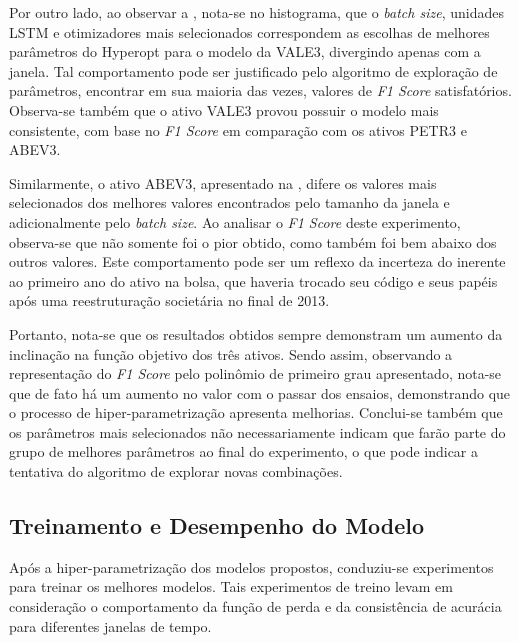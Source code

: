 %

Por outro lado, ao observar a , nota-se no histograma, que o \textit{batch size}, unidades \acrshort{LSTM} e otimizadores mais selecionados correspondem as escolhas de melhores parâmetros do Hyperopt para o modelo da VALE3, divergindo apenas com a janela. Tal comportamento pode ser justificado pelo algoritmo de exploração de parâmetros, encontrar em sua maioria das vezes, valores de \emph{F1 Score} satisfatórios. Observa-se também que o ativo VALE3 provou possuir o modelo mais consistente, com base no \emph{F1 Score} em comparação com os ativos PETR3 e ABEV3.


Similarmente, o ativo ABEV3, apresentado na , difere os valores mais selecionados dos melhores valores encontrados pelo tamanho da janela e adicionalmente pelo \textit{batch size}. Ao analisar o \emph{F1 Score} deste experimento, observa-se que não somente foi o pior obtido, como também foi bem abaixo dos outros valores. Este comportamento pode ser um reflexo da incerteza do inerente ao primeiro ano do ativo na bolsa, que haveria trocado seu código e seus papéis após uma reestruturação societária no final de 2013.

%

Portanto, nota-se que os resultados obtidos sempre demonstram um aumento da inclinação na função objetivo dos três ativos. Sendo assim, observando a representação do \textit{F1 Score} pelo polinômio de primeiro grau apresentado, nota-se que de fato há um aumento no valor com o passar dos ensaios, demonstrando que o processo de hiper-parametrização apresenta melhorias. Conclui-se também que os parâmetros mais selecionados não necessariamente indicam que farão parte do grupo de melhores parâmetros ao final do experimento, o que pode indicar a tentativa do algoritmo de explorar novas combinações.

\subsection{Treinamento e Desempenho do Modelo}
\label{exp:train}

Após a hiper-parametrização dos modelos propostos, conduziu-se experimentos para treinar os melhores modelos. Tais experimentos de treino levam em consideração o comportamento da função de perda e da consistência de acurácia para diferentes janelas de tempo. 

